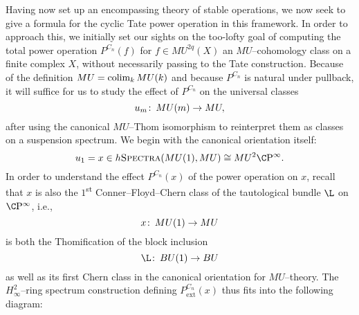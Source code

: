 Having now set up an encompassing theory of stable operations, we now seek to give a formula for the cyclic Tate power operation in this framework.  In order to approach this, we initially set our sights on the too-lofty goal of computing the total power operation \(P^{C_n}(f)\) for \(f \in MU^{2q}(X)\) an \(MU\)--cohomology class on a finite complex \(X\), without necessarily passing to the Tate construction.  Because of the definition \(MU = \operatorname*{colim}_k MU(k)\) and because \(P^{C_n}\) is natural under pullback, it will suffice for us to study the effect of \(P^{C_n}\) on the universal classes \[u_m\colon\thinspace MU(m) \to MU,\] after using the canonical \(MU\)--Thom isomorphism to reinterpret them as classes on a suspension spectrum.  We begin with the canonical orientation itself: \[u_1 = x \in h\CatOf{Spectra}(MU(1), MU) \cong MU^2 \CP^\infty.\]  In order to understand the effect \(P^{C_n}(x)\) of the power operation on \(x\), recall that \(x\) is also the \(1\)\textsuperscript{st} Conner--Floyd--Chern class of the tautological bundle \(\L\) on \(\CP^\infty\), i.e., \[x\colon\thinspace MU(1) \to MU\] is both the Thomification of the block inclusion \[\L\co BU(1) \to BU\] as well as its first Chern class in the canonical orientation for \(MU\)--theory.  The \(H_\infty^2\)--ring spectrum construction defining \(P^{C_n}_{\mathrm{ext}}(x)\) thus fits into the following diagram:
\begin{center}
\end{center}
